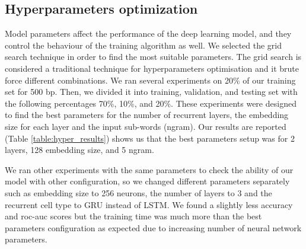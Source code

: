 \documentclass[conference]{IEEEtran}
\begin{document}
\subsection{Hyperparameters optimization}

Model parameters affect the performance of the deep learning model, and they control the behaviour of the training algorithm as well. We selected the grid search technique in order to find the most suitable parameters. The grid search is considered a traditional technique for hyperparameters optimisation and it brute force different combinations. We ran several experiments on 20\% of our training set for 500 bp. Then, we divided it into training, validation, and testing set with the following percentages 70\%, 10\%, and 20\%. These experiments were designed to find the best parameters for the number of recurrent layers, the embedding size for each layer and the input sub-words (ngram). Our results are reported (Table \ref{table:hyper_results}) shows us that the best parameters setup was for 2 layers, 128 embedding size, and 5 ngram. 

We ran other experiments with the same parameters to check the ability of our model with other configuration, so we changed different parameters separately such as embedding size to 256 neurons, the number of layers to 3 and the recurrent cell type to GRU instead of LSTM. We found a slightly less accuracy and roc-auc scores but the training time was much more than the best parameters configuration as expected due to increasing number of neural network parameters.
\end{document}
